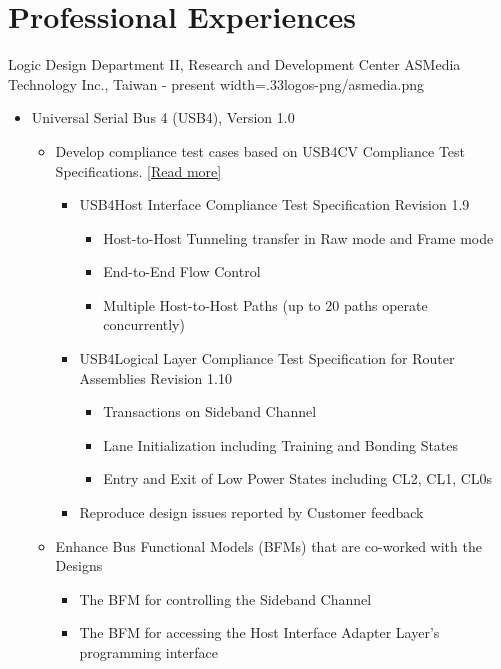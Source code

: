 \documentclass{cvclass}
\newcommand{\simplemmyy}[3]{\shortmmyyformat\formatdate{#3}{#2}{#1}}
\begin{document}
\makeinfo


\section{Professional Experiences}

    {Logic Design Department II, Research and Development Center}
    {ASMedia Technology Inc., Taiwan}
    {\simplemmyy{2023}{7}{17} - present}
    {width=.33\linewidth}{logos-png/asmedia.png}
    {\begin{itemize}
        \item Universal Serial Bus 4 (USB4\textsuperscript{\tiny\textregistered}),  Version 1.0
        \begin{itemize}
            \item Develop compliance test cases based on USB4CV Compliance Test Specifications. \href{https://www.usb.org/document-library/usb4cv-compliance-test-specification}{[Read more]}
            \begin{itemize}
                \item USB4\texttrademark Host Interface Compliance Test Specification Revision 1.9
                \begin{itemize}
                    \item Host-to-Host Tunneling transfer in Raw mode and Frame mode
                    \item End-to-End Flow Control
                    \item Multiple Host-to-Host Paths (up to 20 paths operate concurrently)
                \end{itemize}
                \item USB4\texttrademark Logical Layer Compliance Test Specification for Router Assemblies Revision 1.10
                \begin{itemize}
                    \item Transactions on Sideband Channel
                    \item Lane Initialization including Training and Bonding States
                    \item Entry and Exit of Low Power States including CL2, CL1, CL0s
                \end{itemize}
                \item Reproduce design issues reported by Customer feedback
            \end{itemize}
            \item Enhance Bus Functional Models (BFMs) that are co-worked with the Designs
            \begin{itemize}
                \item The BFM for controlling the Sideband Channel
                \item The BFM for accessing the Host Interface Adapter Layer's programming interface
            \end{itemize}
        \end{itemize}
    \end{itemize}}
\end{document}
